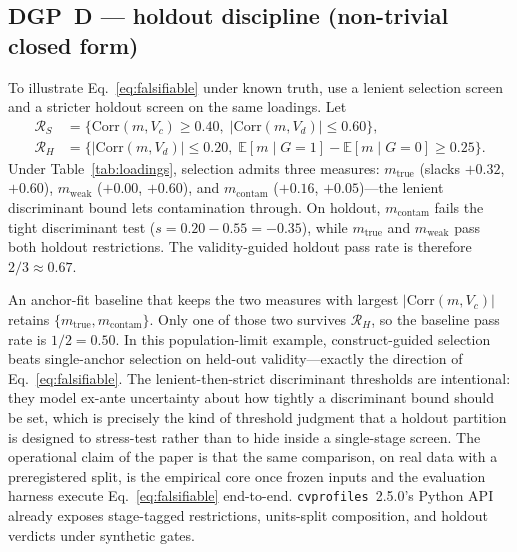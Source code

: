 \documentclass[10pt,letterpaper]{article}
\newcommand{\cvp}{\texttt{cvprofiles}}
\newcommand{\E}{\mathbb{E}}
\newcommand{\Rset}{\mathcal{R}}
\begin{document}
\subsection{DGP~D --- holdout discipline (non-trivial closed form)}
To illustrate Eq.~\eqref{eq:falsifiable} under known truth, use a lenient selection screen and a stricter holdout screen on the same loadings.
Let
\begin{align}
\Rset_S&=\bigl\{\mathrm{Corr}(m,V_{\!c})\ge 0.40,\; \bigl|\mathrm{Corr}(m,V_{\!d})\bigr|\le 0.60\bigr\},
\label{eq:dgpd-sel}\\
\Rset_H&=\bigl\{\bigl|\mathrm{Corr}(m,V_{\!d})\bigr|\le 0.20,\; \E[m\mid G{=}1]-\E[m\mid G{=}0]\ge 0.25\bigr\}.
\label{eq:dgpd-hold}
\end{align}
Under Table~\ref{tab:loadings}, selection admits three measures:
$m_{\mathrm{true}}$ (slacks $+0.32$, $+0.60$),
$m_{\mathrm{weak}}$ ($+0.00$, $+0.60$),
and $m_{\mathrm{contam}}$ ($+0.16$, $+0.05$)---the lenient discriminant bound lets contamination through.
On holdout, $m_{\mathrm{contam}}$ fails the tight discriminant test ($s=0.20-0.55=-0.35$), while $m_{\mathrm{true}}$ and $m_{\mathrm{weak}}$ pass both holdout restrictions.
The validity-guided holdout pass rate is therefore $2/3\approx 0.67$.

An anchor-fit baseline that keeps the two measures with largest $|\mathrm{Corr}(m,V_{\!c})|$ retains $\{m_{\mathrm{true}},m_{\mathrm{contam}}\}$.
Only one of those two survives $\Rset_H$, so the baseline pass rate is $1/2=0.50$.
In this population-limit example, construct-guided selection beats single-anchor selection on held-out validity---exactly the direction of Eq.~\eqref{eq:falsifiable}.
The lenient-then-strict discriminant thresholds are intentional: they model ex-ante uncertainty about how tightly a discriminant bound should be set, which is precisely the kind of threshold judgment that a holdout partition is designed to stress-test rather than to hide inside a single-stage screen.
The operational claim of the paper is that the same comparison, on real data with a preregistered split, is the empirical core once frozen inputs and the evaluation harness execute Eq.~\eqref{eq:falsifiable} end-to-end.
\cvp{}~2.5.0's Python API already exposes stage-tagged restrictions, units-split composition, and holdout verdicts under synthetic gates.
\end{document}
